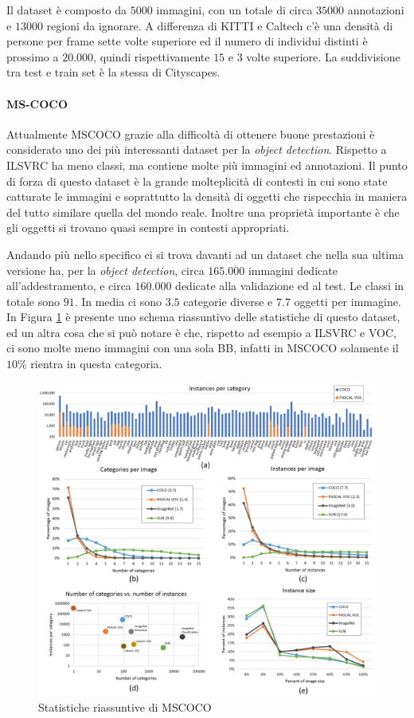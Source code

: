 Il dataset è composto da $5000$ immagini, con un totale di circa $35000$ annotazioni e $13000$ regioni da ignorare. A differenza di KITTI e Caltech c'è una densità di persone per frame sette volte superiore ed il numero di individui distinti è prossimo a $20.000$, quindi rispettivamente $15$ e $3$ volte superiore.  La suddivisione tra test e train set è la stessa di Cityscapes. 
\paragraph{MS-COCO} \cite{lin2014microsoft}
Attualmente \ac{MSCOCO} grazie alla difficoltà di ottenere buone prestazioni è considerato uno dei più interessanti dataset per la \textit{object detection}. Rispetto a \ac{ILSVRC} ha meno classi, ma contiene molte più immagini ed annotazioni. Il punto di forza di questo dataset è la grande molteplicità di contesti in cui sono state catturate le immagini e soprattutto la densità di oggetti che rispecchia in maniera del tutto similare quella del mondo reale. Inoltre una proprietà importante è che gli oggetti si trovano quasi sempre in contesti appropriati.

Andando più nello specifico ci si trova davanti ad un dataset che nella sua ultima versione ha, per la \textit{object detection}, circa $165.000$ immagini dedicate all'addestramento, e circa $160.000$ dedicate alla validazione ed al test. Le classi in totale sono $91$. In media ci sono $3.5$ categorie diverse e $7.7$ oggetti per immagine. In Figura \ref{fig:dataanalysis_coco} è presente uno schema riassuntivo delle statistiche di questo dataset, ed un altra cosa che si può notare è che, rispetto ad esempio a \ac{ILSVRC} e \ac{VOC}, ci sono molte meno immagini con una sola \ac{BB}, infatti in \ac{MSCOCO} solamente il $10\%$ rientra in questa categoria.
\begin{figure}
    \centering
    \includegraphics[width=\textwidth]{images/dataanalysis.png}
    \caption{Statistiche riassuntive di \ac{MSCOCO} \cite{lin2014microsoft}}
    \label{fig:dataanalysis_coco}
\end{figure}
